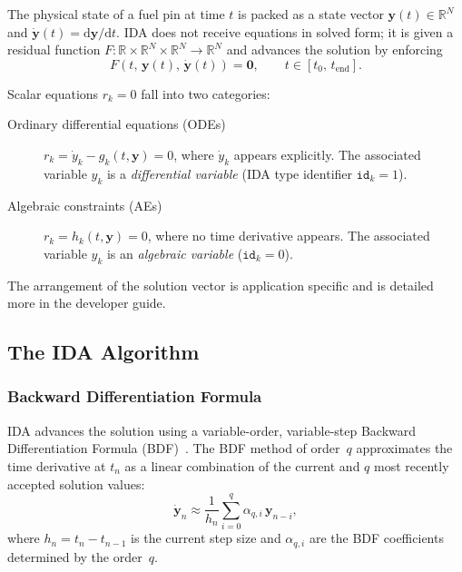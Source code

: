 \begin{refsection}
The physical state of a fuel pin at time $t$ is packed as a state vector $\mathbf{y}(t) \in \mathbb{R}^N$ and $\dot{\mathbf{y}}(t) = \mathrm{d}\mathbf{y}/\mathrm{d}t$. IDA does not receive equations in solved form; it is given a residual function $F : \mathbb{R} \times \mathbb{R}^N \times \mathbb{R}^N \to \mathbb{R}^N$ and advances the solution by enforcing
\begin{equation}
  F\!\left(t,\,\mathbf{y}(t),\,\dot{\mathbf{y}}(t)\right) = \mathbf{0},
  \qquad t \in [t_0,\, t_\mathrm{end}].
  \label{eq:dae_general}
\end{equation}

Scalar equations $r_k = 0$ fall into two categories:
\begin{description}
\item[Ordinary differential equations (ODEs)] $r_k = \dot{y}_k - g_k(t,\mathbf{y}) = 0$, where $\dot{y}_k$ appears explicitly.  The associated variable $y_k$ is a \emph{differential variable} (IDA type identifier $\mathtt{id}_k = 1$).
\item[Algebraic constraints (AEs)] $r_k = h_k(t,\mathbf{y}) = 0$, where no time derivative appears.  The associated variable $y_k$ is an \emph{algebraic variable} ($\mathtt{id}_k = 0$).
\end{description}

The arrangement of the solution vector is application specific and is detailed more in the developer guide.

\subsection{The IDA Algorithm}
\label{sec:ida_algorithm}

\subsubsection{Backward Differentiation Formula}
\label{subsec:bdf}

IDA advances the solution using a variable-order, variable-step Backward Differentiation Formula (BDF)~\cite{hindmarsh2005}.  The BDF method of order~$q$ approximates the time derivative at $t_n$ as a linear combination of the current and $q$ most recently accepted solution values:
\begin{equation}
  \dot{\mathbf{y}}_n \approx \frac{1}{h_n}\sum_{i=0}^{q}\alpha_{q,i}\,\mathbf{y}_{n-i},
  \label{eq:bdf}
\end{equation}
where $h_n = t_n - t_{n-1}$ is the current step size and $\alpha_{q,i}$ are the BDF coefficients determined by the order~$q$.


\end{refsection}
